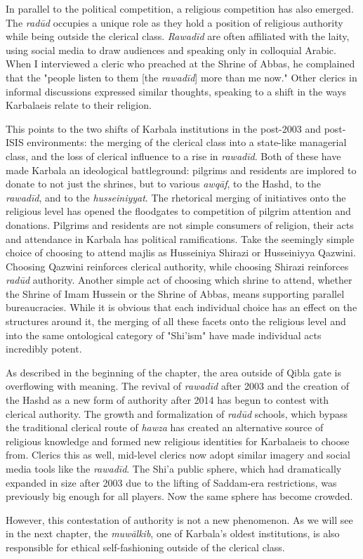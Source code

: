 In parallel to the political competition, a religious competition has also emerged. The \emph{radūd} occupies a unique role as they hold a position of religious authority while being outside the clerical class. \emph{Rawadīd} are often affiliated with the laity, using social media to draw audiences and speaking only in colloquial Arabic. When I interviewed a cleric who preached at the Shrine of Abbas, he complained that the "people listen to them [the \emph{rawadīd}] more than me now." Other clerics in informal discussions expressed similar thoughts, speaking to a shift in the ways Karbalaeis relate to their religion. 

This points to the two shifts of Karbala institutions in the post-2003 and post-ISIS environments: the merging of the clerical class into a state-like managerial class, and the loss of clerical influence to a rise in \emph{rawadīd}. Both of these have made Karbala an ideological battleground: pilgrims and residents are implored to donate to not just the shrines, but to various \emph{awqāf}, to the Hashd, to the \emph{rawadīd}, and to the \emph{husseiniyyat}. The rhetorical merging of initiatives onto the religious level has opened the floodgates to competition of pilgrim attention and donations. Pilgrims and residents are not simple consumers of religion, their acts and attendance in Karbala has political ramifications. Take the seemingly simple choice of choosing to attend majlis as Husseiniya Shirazi or Husseiniyya Qazwini. Choosing Qazwini reinforces clerical authority, while choosing Shirazi reinforces \emph{radūd} authority. Another simple act of choosing which shrine to attend, whether the Shrine of Imam Hussein or the Shrine of Abbas, means supporting parallel bureaucracies. While it is obvious that each individual choice has an effect on the structures around it, the merging of all these facets onto the religious level and into the same ontological category of "Shi'ism" have made individual acts incredibly potent. 

As described in the beginning of the chapter, the area outside of Qibla gate is overflowing with meaning. The revival of \emph{rawadīd} after 2003 and the creation of the Hashd as a new form of authority after 2014 has begun to contest with clerical authority. The growth and formalization of \emph{radūd} schools, which bypass the traditional clerical route of \emph{hawza} has created an alternative source of religious knowledge and formed new religious identities for Karbalaeis to choose from. Clerics this as well, mid-level clerics now adopt similar imagery and social media tools like the \emph{rawadīd}. The Shi'a public sphere, which had dramatically expanded in size after 2003 due to the lifting of Saddam-era restrictions, was previously big enough for all players. Now the same sphere has become crowded.

However, this contestation of authority is not a new phenomenon. As we will see in the next chapter, the \emph{muwālkib}, one of Karbala's oldest institutions, is also responsible for ethical self-fashioning outside of the clerical class. 
